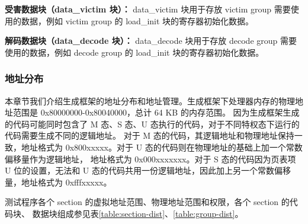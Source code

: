 \textbf{受害数据块（data\_victim 块）：}
data\_victim 块用于存放 victim group 需要使用的数据，例如 victim group 的 load\_init 块的寄存器初始化数据。\par

\textbf{解码数据块（data\_decode 块）：}
data\_decode 块用于存放 decode group 需要使用的数据，例如 decode group 的 load\_init 块的寄存器初始化数据。\par

\subsubsection{地址分布}

本章节我们介绍生成框架的地址分布和地址管理。生成框架下处理器内存的物理地址范围是 0x80000000-0x80040000，总计 64 KB 的内存范围。
因为生成框架生成的代码可能同时包含了 M 态、S 态、U 态执行的代码，对于不同特权态下运行的代码需要生成不同的逻辑地址。
对于 M 态的代码，其逻辑地址和物理地址保持一致，地址格式为 0x800xxxxx。对于 U 态的代码则在物理地址的基础上加一个常数偏移量作为逻辑地址，
地址格式为 0x000xxxxxxx。对于 S 态的代码因为页表项 U 位的设置，无法和 U 态的代码共用一份逻辑地址，因此加上另一个常数偏移量，地址格式为
0xfffxxxxx。\par

测试程序各个 section 的虚拟地址范围、物理地址范围和权限，各个 section 的代码块、
数据块组成参见表\ref{table:section-dist}、\ref{table:group-dist}。

